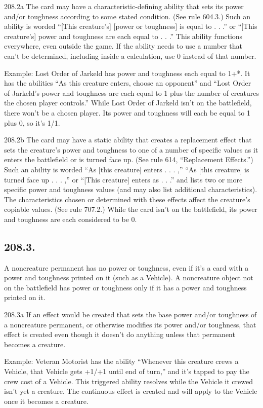 208.2a The card may have a characteristic-defining ability that sets its power and/or toughness according to some stated condition. (See rule 604.3.) Such an ability is worded “[This creature’s] [power or toughness] is equal to . . .” or “[This creature’s] power and toughness are each equal to . . .” This ability functions everywhere, even outside the game. If the ability needs to use a number that can’t be determined, including inside a calculation, use 0 instead of that number.

Example: Lost Order of Jarkeld has power and toughness each equal to 1+*. It has the abilities “As this creature enters, choose an opponent” and “Lost Order of Jarkeld’s power and toughness are each equal to 1 plus the number of creatures the chosen player controls.” While Lost Order of Jarkeld isn’t on the battlefield, there won’t be a chosen player. Its power and toughness will each be equal to 1 plus 0, so it’s 1/1.

208.2b The card may have a static ability that creates a replacement effect that sets the creature’s power and toughness to one of a number of specific values as it enters the battlefield or is turned face up. (See rule 614, “Replacement Effects.”) Such an ability is worded “As [this creature] enters . . . ,” “As [this creature] is turned face up . . . ,” or “[This creature] enters as . . .” and lists two or more specific power and toughness values (and may also list additional characteristics). The characteristics chosen or determined with these effects affect the creature’s copiable values. (See rule 707.2.) While the card isn’t on the battlefield, its power and toughness are each considered to be 0.

\subsection*{208.3.}
A noncreature permanent has no power or toughness, even if it’s a card with a power and toughness printed on it (such as a Vehicle). A noncreature object not on the battlefield has power or toughness only if it has a power and toughness printed on it.

208.3a If an effect would be created that sets the base power and/or toughness of a noncreature permanent, or otherwise modifies its power and/or toughness, that effect is created even though it doesn’t do anything unless that permanent becomes a creature.

Example: Veteran Motorist has the ability “Whenever this creature crews a Vehicle, that Vehicle gets +1/+1 until end of turn,” and it’s tapped to pay the crew cost of a Vehicle. This triggered ability resolves while the Vehicle it crewed isn’t yet a creature. The continuous effect is created and will apply to the Vehicle once it becomes a creature.

